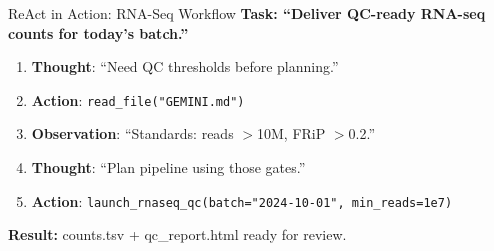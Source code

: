 \documentclass[aspectratio=169]{beamer}
\begin{document}
\begin{frame}{ReAct in Action: RNA-Seq Workflow}
  \centering
  \large\bfseries
  Task: ``Deliver QC-ready RNA-seq counts for today's batch.''

  \vspace{0.5cm}
  \normalsize

  \begin{enumerate}
    \item \textcolor{conesaTeal}{\textbf{Thought}}: ``Need QC thresholds before planning.''

    \vspace{0.3cm}

    \item \textcolor{conesaOrange}{\textbf{Action}}: \texttt{read\_file("GEMINI.md")}

    \vspace{0.3cm}

    \item \textcolor{conesaGray}{\textbf{Observation}}: ``Standards: reads $>$10M, FRiP $>$0.2.''

    \vspace{0.3cm}

    \item \textcolor{conesaTeal}{\textbf{Thought}}: ``Plan pipeline using those gates.''

    \vspace{0.3cm}

    \item \textcolor{conesaOrange}{\textbf{Action}}: \texttt{launch\_rnaseq\_qc(batch="2024-10-01", min\_reads=1e7)}
  \end{enumerate}

  \vspace{0.5cm}
  \centering
  \textbf{Result:} counts.tsv + qc\_report.html ready for review.
\end{frame}
\end{document}
